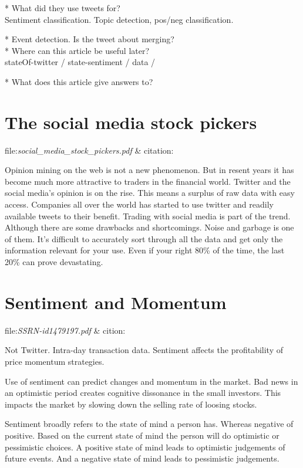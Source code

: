 * What did they use tweets for?\\
Sentiment classification. Topic detection, pos/neg classification.  

* Event detection. Is the tweet about merging? \\
* Where can this article be useful later? \\
stateOf-twitter / state-sentiment /  data / 

* What does this article give answers to?\\

\section{The social media stock pickers}
file:\textit{social\_media\_stock\_pickers.pdf} & citation:\cite[]{stevenson12:social_media_stock_pickers}

Opinion mining on the web is not a new phenomenon. But in resent years it has
become much more attractive to traders in the financial world. Twitter and the
social media's opinion is on the rise. This means a surplus of raw data with
easy access. Companies all over the world has started to use twitter and
readily available tweets to their benefit. Trading with social media is part of
the trend. Although there are some drawbacks and shortcomings. Noise and
garbage is one of them. It's difficult to accurately sort through all the data
and get only the information relevant for your use. Even if your right 80\% of
the time, the last 20\% can prove devastating. \cite[]{stevenson12:social_media_stock_pickers}

\section{Sentiment and Momentum}\label{sentiment_and_momentum}
file:\textit{SSRN-id1479197.pdf} & cition:\cite[]{doukas10:sentiment_and_momentum}

Not Twitter. Intra-day transaction data. 
Sentiment affects the profitability of price momentum strategies.

Use of sentiment can predict changes and momentum in the market.
Bad news in an optimistic period creates cognitive dissonance in the small
investors. This impacts the market by slowing down the selling rate of loosing
stocks. \cite[p29]{doukas10:sentiment_and_momentum} 

Sentiment broadly refers to the state of mind a person has. Whereas negative of
positive. Based on the current state of mind the person will do optimistic or
pessimistic choices. A positive state of mind leads to optimistic judgements of
future events. And a negative state of mind leads to pessimistic judgements. 
\cite[p4]{doukas10:sentiment_and_momentum} 

